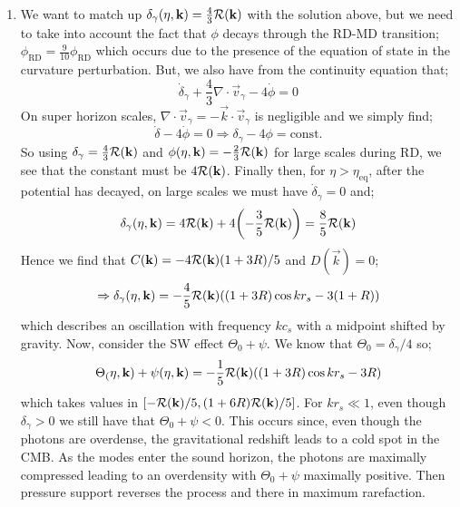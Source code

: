 \begin{enumerate}
\item We want to match up $\delta_\gamma(\eta, \mathbf{k}) = \tfrac{4}{3}\mathcal{R}(\mathbf{k})$ with the solution above, but we need to take into account the fact that $\phi$ decays through the RD-MD transition; $\phi_{\text{RD}} = \tfrac{9}{10}\phi_{\text{RD}}$ which occurs due to the presence of the equation of state in the curvature perturbation. But, we also have from the continuity equation that;
\begin{equation*}
\dot{\delta}_\gamma + \frac{4}{3}\nabla \cdot \vec{v}_\gamma - 4\dot{\phi} = 0
\end{equation*}
On super horizon scales, $\nabla \cdot\vec{v}_\gamma = -\vec{k}\cdot\vec{v}_\gamma$ is negligible and we simply find;
\begin{equation*}
\dot{\delta} - 4\dot{\phi} = 0 \Rightarrow \delta_\gamma - 4\phi = \text{const.}
\end{equation*}
So using $\delta_\gamma = \tfrac{4}{3}\mathcal{R}(\mathbf{k})$ and $\phi(\eta, \mathbf{k}) = -\tfrac{2}{3}\mathcal{R}(\mathbf{k})$ for large scales during RD, we see that the constant must be $4\mathcal{R}(\mathbf{k})$. Finally then, for $\eta > \eta_{\text{eq}}$, after the potential has decayed, on large scales we must have $\dot{\delta}_\gamma = 0$ and;
\begin{equation}
\delta_\gamma(\eta, \vec{k}) = 4\mR(\vec{k}) + 4 \left(- \frac{3}{5}\mR(\vec{k})\right) = \frac{8}{5}\mR(\vec{k})
\end{equation}
Hence we find that $C(\mathbf{k}) = -4\mathcal{R}(\mathbf k)(1 + 3R)/5$ and $D(\vec k) = 0$;
\begin{equation}
\Rightarrow \delta_\gamma(\eta, \vec{k}) = -\frac{4}{5}\mR(\vec{k})\left((1 + 3R)\cos kr_s - 3(1 + R)\right)
\end{equation}
which describes an oscillation with frequency $kc_s$ with a midpoint shifted by gravity. Now, consider the SW effect $\Theta_0 + \psi$. We know that $\Theta_0 = \delta_\gamma / 4$ so;
\begin{equation}
\label{eq:sw}
\Theta_(\eta, \vec{k}) + \psi(\eta, \vec{k}) = -\frac{1}{5}\mR(\vec{k})\left((1 + 3R)\cos kr_s - 3R\right)
\end{equation}
which takes values in $\left[-\mR(\vec{k})/5, (1 + 6R)\mR(\vec{k}) / 5\right]$. For $kr_s \ll 1$, even though $\delta_\gamma > 0$ we still have that $\Theta_0 + \psi < 0$. This occurs since, even though the photons are overdense, the gravitational redshift leads to a cold spot in the CMB. As the modes enter the sound horizon, the photons are maximally compressed leading to an overdensity with $\Theta_0 + \psi$ maximally positive. Then pressure support reverses the process and there in maximum rarefaction. 

\end{enumerate}
